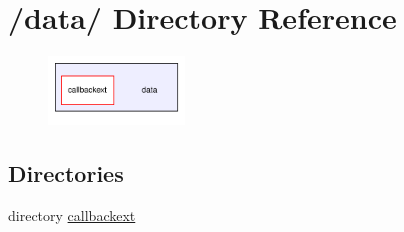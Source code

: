 \hypertarget{dir_000000}{
\section{/data/ Directory Reference}
\label{dir_000000}
}


\begin{figure}[H]
\begin{center}
\leavevmode
\includegraphics[width=103pt]{dir_000000_dep}
\end{center}
\end{figure}
\subsection*{Directories}
\begin{CompactItemize}
\item 
directory \hyperlink{dir_000001}{callbackext}
\end{CompactItemize}
